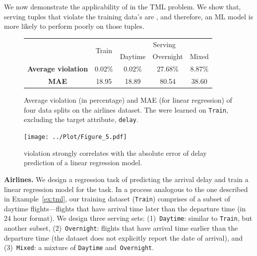  We now demonstrate the applicability of \dis in the TML problem.
We show that, serving tuples that violate the training data's \dis are \nc, and
therefore, an ML model is more likely to perform poorly on those tuples.


\smallskip

\begin{figure}[t!]
	\centering
	\setlength{\tabcolsep}{5pt}
	\renewcommand\arraystretch{0.88}
	\small{
	\begin{tabular}{ccccc}
		\hline
		&  \multirow{ 2}{*}{Train} & \multicolumn{3}{c}{Serving}\\
		\cline{3-5}
		&& Daytime & Overnight & Mixed \\
		\midrule
		\textbf{Average violation} & 0.02\% & 0.02\% & 27.68\% & 8.87\%\\
		\textbf{MAE} & 18.95	 &  18.89 & 80.54 & 38.60\\
		\bottomrule
		
	\end{tabular}
	}
		\vspace{-3mm}	
	 \caption{Average \invariant violation (in percentage) and MAE (for linear regression) 
	 of four data splits on the airlines dataset. The \invariants were learned on
 	 \texttt{Train}, excluding the target attribute, \texttt{delay}.}
	 
	\label{fig:airlines-summary}
	\vspace{2mm}
	\centering
	\texttt{[image: ../Plot/Figure\_5.pdf]}
	\vspace{-3mm}	
	\caption{\Invariant violation strongly correlates with the absolute error
	 of delay prediction of a linear regression model.}
	 \vspace{2mm}	
	\label{fig:airlines}
\end{figure}


\noindent \textbf{Airlines.} We design a regression task of predicting the
arrival delay and train a linear regression model for the task.  In
a process analogous to the one described in Example~\ref{ex:tml}, our training
dataset (\texttt{Train}) comprises of a subset of daytime flights---flights
that have arrival time later than the departure time (in 24 hour format). We
design three serving sets: (1)~\texttt{Daytime}: similar to \texttt{Train}, but
another subset, (2)~\texttt{Overnight}: flights that have arrival time earlier
than the departure time (the dataset does not explicitly report the date of
arrival), and (3)~\texttt{Mixed}: a mixture of \texttt{Daytime}
and~\texttt{Overnight}. 

